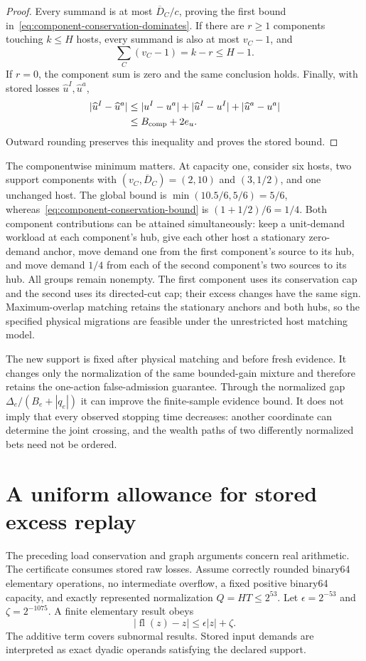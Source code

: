 \documentclass[11pt]{article}
\begin{document}
\begin{proof}
Every summand is at most $\overline D_C/c$, proving the first bound in~\eqref{eq:component-conservation-dominates}. If there are $r\ge1$ components touching $k\le H$ hosts, every summand is also at most $v_C-1$, and
\begin{equation}
\sum_C(v_C-1)=k-r\le H-1.
\end{equation}
If $r=0$, the component sum is zero and the same conclusion holds. Finally, with stored losses $\widehat u^I,\widehat u^a$,
\begin{align}
|\widehat u^I-\widehat u^a|
&\le|u^I-u^a|+|\widehat u^I-u^I|+|\widehat u^a-u^a|\\
&\le B_{\rm comp}+2e_u.
\end{align}
Outward rounding preserves this inequality and proves the stored bound.
\end{proof}

The componentwise minimum matters. At capacity one, consider six hosts, two support components with $(v_C,\overline D_C)=(2,10)$ and $(3,1/2)$, and one unchanged host. The global bound is $\min(10.5/6,5/6)=5/6$, whereas~\eqref{eq:component-conservation-bound} is $(1+1/2)/6=1/4$. Both component contributions can be attained simultaneously: keep a unit-demand workload at each component's hub, give each other host a stationary zero-demand anchor, move demand one from the first component's source to its hub, and move demand $1/4$ from each of the second component's two sources to its hub. All groups remain nonempty. The first component uses its conservation cap and the second uses its directed-cut cap; their excess changes have the same sign. Maximum-overlap matching retains the stationary anchors and both hubs, so the specified physical migrations are feasible under the unrestricted host matching model.

The new support is fixed after physical matching and before fresh evidence. It changes only the normalization of the same bounded-gain mixture and therefore retains the one-action false-admission guarantee. Through the normalized gap $\Delta_e/(B_e+|q_e|)$ it can improve the finite-sample evidence bound. It does not imply that every observed stopping time decreases: another coordinate can determine the joint crossing, and the wealth paths of two differently normalized bets need not be ordered.


\section{A uniform allowance for stored excess replay}
The preceding load conservation and graph arguments concern real arithmetic. The certificate consumes stored raw losses. Assume correctly rounded binary64 elementary operations, no intermediate overflow, a fixed positive binary64 capacity, and exactly represented normalization $Q=HT\le2^{53}$. Let $\epsilon=2^{-53}$ and $\zeta=2^{-1075}$. A finite elementary result obeys
\begin{equation}
 |\operatorname{fl}(z)-z|\le\epsilon|z|+\zeta.
\end{equation}
The additive term covers subnormal results. Stored input demands are interpreted as exact dyadic operands satisfying the declared support.
\end{document}
